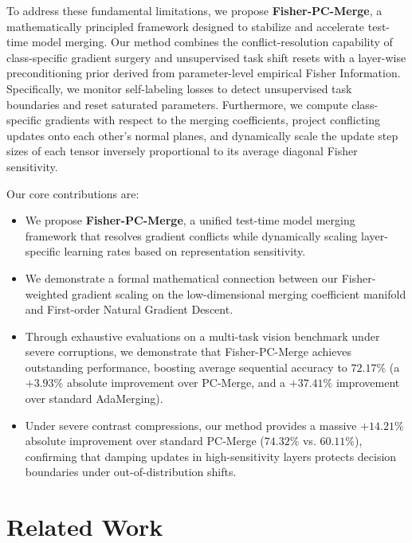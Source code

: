 \documentclass{article}
\theoremstyle{plain}
\theoremstyle{definition}
\theoremstyle{remark}
\begin{document}
To address these fundamental limitations, we propose \textbf{Fisher-PC-Merge}, a mathematically principled framework designed to stabilize and accelerate test-time model merging. Our method combines the conflict-resolution capability of class-specific gradient surgery and unsupervised task shift resets with a layer-wise preconditioning prior derived from parameter-level empirical Fisher Information. Specifically, we monitor self-labeling losses to detect unsupervised task boundaries and reset saturated parameters. Furthermore, we compute class-specific gradients with respect to the merging coefficients, project conflicting updates onto each other's normal planes, and dynamically scale the update step sizes of each tensor inversely proportional to its average diagonal Fisher sensitivity. 

Our core contributions are:
\begin{itemize}
    \item We propose \textbf{Fisher-PC-Merge}, a unified test-time model merging framework that resolves gradient conflicts while dynamically scaling layer-specific learning rates based on representation sensitivity.
    \item We demonstrate a formal mathematical connection between our Fisher-weighted gradient scaling on the low-dimensional merging coefficient manifold and First-order Natural Gradient Descent.
    \item Through exhaustive evaluations on a multi-task vision benchmark under severe corruptions, we demonstrate that Fisher-PC-Merge achieves outstanding performance, boosting average sequential accuracy to \textbf{$72.17\%$} (a $+3.93\%$ absolute improvement over PC-Merge, and a $+37.41\%$ improvement over standard AdaMerging).
    \item Under severe contrast compressions, our method provides a massive \textbf{$+14.21\%$} absolute improvement over standard PC-Merge ($74.32\%$ vs. $60.11\%$), confirming that damping updates in high-sensitivity layers protects decision boundaries under out-of-distribution shifts.
\end{itemize}

\section{Related Work}
\label{related_work}
\end{document}
